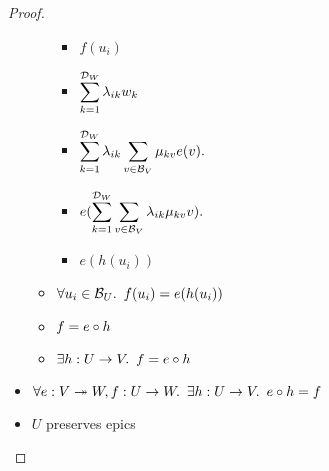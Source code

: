 \begin{prop}
\begin{proof}
\begin{itemize}
\begin{itemize}
\begin{itemize}
              \item[\phs] $f(u_i)$

              \item[\eqs] $\displaystyle\sum\limits_{k=1}^{\mathcal{D}_{W}}\lambda_{ik}w_k$

              \item[\eqs] $\displaystyle\sum\limits_{k=1}^{\mathcal{D}_{W}}\lambda_{ik}\displaystyle\sum\limits_{v\in\mathcal{B}_{V}}\mu_{kv}e(v).$

              \item[\eqs] $e(\displaystyle\sum\limits_{k=1}^{\mathcal{D}_{W}}\displaystyle\sum\limits_{v\in\mathcal{B}_{V}}\lambda_{ik}\mu_{kv}v).$

              \item[\eqs] $e(h(u_i))$
            \end{itemize}
            \item[\imps]
              $\forall u_i\in\mathcal{B}_{U}\ldotp~f(u_i) = e(h(u_i))$
              \marginnote{$\forall$-\Intro-$\dagger$}

            \item[\iffs]
              $f = e\circ h$
              \marginnote{\Def-$=$}

            \item[\imps]
              $\exists h : U \to V\ldotp~f = e\circ h$
              \marginnote{$\exists$-\Intro}
        \end{itemize}

        \item[\imps]
          $\forall e : V\twoheadrightarrow W, f : U \to W\ldotp~\exists h : U\to V\ldotp~e\circ h = f$
          \marginnote{$\forall$-\Intro-$\star$}

        \item[\imps]
          $U$ preserves epics
          \qedhere
    \end{itemize}
  \end{proof}
\end{prop}
